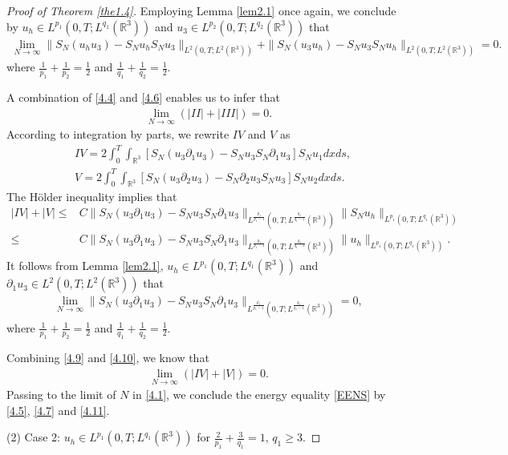 \documentclass[11pt]{article}
\theoremstyle{plain}\newtheorem{definition}{Definition}[section]
\theoremstyle{definition}\newtheorem{theorem}{Theorem}[section]
\theoremstyle{plain}\newtheorem{lemma}[theorem]{Lemma}
\theoremstyle{plain}\newtheorem{coro}[theorem]{Corollary}
\theoremstyle{plain}\newtheorem{prop}[theorem]{Proposition}
\theoremstyle{remark}\newtheorem{remark}{Remark}[section]
\newcommand{\be}{\begin{equation}}
\newcommand{\ee}{\end{equation}}
\newcommand{\ba}{\begin{aligned}}
\newcommand{\ea}{\end{aligned}}
\newcommand{\f}{\frac}
\numberwithin{equation}{section}
\begin{document}
\begin{proof}[Proof of Theorem \ref{the1.4}]
Employing Lemma  \ref{lem2.1} once again, we conclude by $u_{h}\in L^{p_{1}}(0,T;L^{q_{1}}(\mathbb{R}^{3}))$ and $u_{3}\in L^{p_{2}}(0,T;L^{q_{2}}(\mathbb{R}^{3}))$  that
\be\ba\label{4.6}
\lim_{N\rightarrow\infty} \|S_{N}(u_{h}u_{3} )-S_{N} u_{h}S_{N}u_{3}\|_{L^{2}(0,T;L^{2}(\mathbb{R}^{3}))}+\|S_{N}(u_{3}u_{h} )-S_{N} u_{3}S_{N} u_{h}\|_{L^{2}(0,T;L^{2}(\mathbb{R}^{3}))}=0.
\ea\ee
where $\f{1}{p_{1}}+\f{1}{p_{2}}=\f12$ and $\f{1}{q_{1}}+\f{1}{q_{2}}=\f12$.

A combination of \eqref{4.4} and \eqref{4.6} enables us to infer that
\be\ba\label{4.7}
\lim_{N\rightarrow\infty}(|II|+|III|)=0.
\ea\ee
According to integration by parts, we rewrite $IV$ and $V$ as
\be\ba
&IV = 2\int_{0}^{T} \int_{\mathbb{R}^{3}} [S_{N}(u_{3}\partial_{1}u_{3} )-S_{N} u_{3}S_{N}\partial_{1}u_{3}  ] S_{N}u_{1} dxds,
\\
 & V =  2\int_{0}^{T}\int_{\mathbb{R}^{3}} [S_{N}(u_{3}\partial_{2}u_{3} )-S_{N} \partial_{2}u_{3}S_{N}u_{3}  ]S_{N}u_{2} dxds.
\ea\ee
The H\"older inequality implies that
\be\ba\label{4.9}
|IV|+|V|\leq& C\|S_{N}(u_{3}\partial_{1}u_{3} )-S_{N} u_{3}S_{N}\partial_{1}u_{3}\|_{L^{\f{p_{1}}{p_{1}-1}}(0,T;L^{\f{q_{1}}{q_{1}-1}}(\mathbb{R}^{3}))}
\|S_{N}u_{h}\|_{L^{p_{1}}(0,T;L^{q_{1}}(\mathbb{R}^{3}))}
\\
\leq& C\|S_{N}(u_{3}\partial_{1}u_{3} )-S_{N} u_{3}S_{N}\partial_{1}u_{3}\|_{L^{\f{p_{1}}{p_{1}-1}}(0,T;L^{\f{q_{1}}{q_{1}-1}}(\mathbb{R}^{3}))}
\| u_{h}\|_{L^{p_{1}}(0,T;L^{q_{1}}(\mathbb{R}^{3}))}.
\ea\ee
It follows from Lemma \ref{lem2.1}, $u_{h}\in L^{p_{1}}(0,T;L^{q_{1}}(\mathbb{R}^{3}))$ and $\partial_{1}u_{3}\in L^{2}(0,T;L^{2}(\mathbb{R}^{3}))$ that
\be\ba\label{4.10}
\lim_{N\rightarrow\infty}
\|S_{N}(u_{3}\partial_{1}u_{3} )-S_{N} u_{3}S_{N}\partial_{1}u_{3}\|_{L^{\f{p_{1}}{p_{1}-1}}(0,T;L^{\f{q_{1}}{q_{1}-1}}(\mathbb{R}^{3}))}
=0,
\ea\ee
where
$\f{1}{p_{1}}+\f{1}{p_{2}}=\f12$ and $\f{1}{q_{1}}+\f{1}{q_{2}}=\f12.$

Combining  \eqref{4.9} and \eqref{4.10}, we know that
\be\ba\label{4.11}
\lim_{N\rightarrow\infty}(|IV|+|V|)=0.
\ea\ee
Passing to the limit of $N$ in \eqref{4.1}, we conclude the energy equality \eqref{EENS} by
\eqref{4.5}, \eqref{4.7} and \eqref{4.11}.


(2) Case 2: $u_{h}\in L^{p_{1}}(0,T;L^{q_{1}}(\mathbb{R}^{3}))$ for $\f{2}{p_{1}}+\f{3}{q_{1}}=1$, $q_{1}\geq 3.$


\end{proof}
\end{document}
